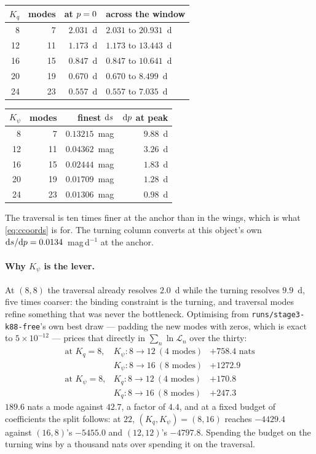\documentclass[11pt]{article}
\newcommand{\file}[1]{\texttt{#1}}
\begin{document}
\begin{tabular}{@{}r r r l@{}}
\toprule
$K_{q}$ & modes & at $p = 0$ & across the window \\
\midrule
 8 &  7 & $2.031$~d & $2.031$ to $20.931$~d \\
12 & 11 & $1.173$~d & $1.173$ to $13.443$~d \\
16 & 15 & $0.847$~d & $0.847$ to $10.641$~d \\
20 & 19 & $0.670$~d & $0.670$ to $ 8.499$~d \\
24 & 23 & $0.557$~d & $0.557$ to $ 7.035$~d \\
\bottomrule
\end{tabular}
\hfill
\begin{tabular}{@{}r r r r@{}}
\toprule
$K_{\psi}$ & modes & finest $\mathrm{d}s$ & $\mathrm{d}p$ at peak \\
\midrule
 8 &  7 & $0.13215$~mag & $9.88$~d \\
12 & 11 & $0.04362$~mag & $3.26$~d \\
16 & 15 & $0.02444$~mag & $1.83$~d \\
20 & 19 & $0.01709$~mag & $1.28$~d \\
24 & 23 & $0.01306$~mag & $0.98$~d \\
\bottomrule
\end{tabular}

\medskip\noindent
The traversal is ten times finer at the anchor than in the wings, which is what
\eqref{eq:ccoords} is for. The turning column converts at this object's own
$\mathrm{d}s/\mathrm{d}p = 0.0134$~mag\,d$^{-1}$ at the anchor.

\paragraph{Why $K_{\psi}$ is the lever.} At $(8,8)$ the traversal already resolves $2.0$~d
while the turning resolves $9.9$~d, five times coarser: the binding constraint is the
turning, and traversal modes refine something that was never the bottleneck. Optimising
from \file{runs/stage3-k88-free}'s own best draw --- padding the new modes with zeros,
which is exact to $5\times10^{-12}$ --- prices that directly in
$\sum_{n}\ln\mathcal{L}_{n}$ over the thirty:
\[
\begin{array}{llr}
\text{at } K_{q} = 8, & K_{\psi}: 8 \to 12 \ (4 \text{ modes}) & +758.4 \text{ nats} \\
                      & K_{\psi}: 8 \to 16 \ (8 \text{ modes}) & +1272.9 \\
\text{at } K_{\psi} = 8, & K_{q}: 8 \to 12 \ (4 \text{ modes}) & +170.8 \\
                      & K_{q}: 8 \to 16 \ (8 \text{ modes}) & +247.3
\end{array}
\]
$189.6$ nats a mode against $42.7$, a factor of $4.4$, and at a fixed budget of
coefficients the split follows: at $22$, $(K_{q},K_{\psi}) = (8,16)$ reaches $-4429.4$
against $(16,8)$'s $-5455.0$ and $(12,12)$'s $-4797.8$. Spending the budget on the
turning wins by a thousand nats over spending it on the traversal.
\end{document}
